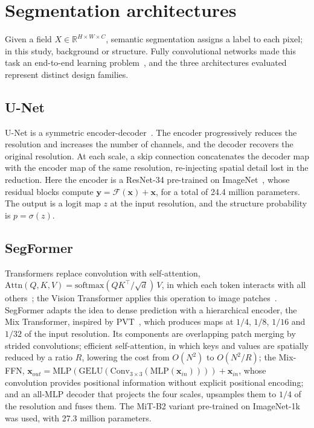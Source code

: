 \documentclass[final,5p,times,twocolumn]{elsarticle}
\begin{document}
\section{Segmentation architectures}\label{sec:sec3}

Given a field $X\in\mathbb{R}^{H\times W\times C}$, semantic segmentation assigns a label to each pixel; in this study, background or structure. Fully convolutional networks made this task an end-to-end learning problem~\cite{long2015fcn}, and the three architectures evaluated represent distinct design families.

\subsection{U-Net}\label{subsec:unet}

U-Net is a symmetric encoder-decoder~\cite{ronneberger2015unet}. The encoder progressively reduces the resolution and increases the number of channels, and the decoder recovers the original resolution. At each scale, a skip connection concatenates the decoder map with the encoder map of the same resolution, re-injecting spatial detail lost in the reduction. Here the encoder is a ResNet-34 pre-trained on ImageNet~\cite{he2016resnet,deng2009imagenet}, whose residual blocks compute $\mathbf{y}=\mathcal{F}(\mathbf{x})+\mathbf{x}$, for a total of 24.4 million parameters. The output is a logit map $z$ at the input resolution, and the structure probability is $p=\sigma(z)$.

\subsection{SegFormer}\label{subsec:segformer}

Transformers replace convolution with self-attention, $\mathrm{Attn}(Q,K,V)=\mathrm{softmax}(QK^\top/\sqrt{d})\,V$, in which each token interacts with all others~\cite{vaswani2017}; the Vision Transformer applies this operation to image patches~\cite{dosovitskiy2021vit}. SegFormer adapts the idea to dense prediction with a hierarchical encoder, the Mix Transformer, inspired by PVT~\cite{wang2021pvt,xie2021segformer}, which produces maps at $1/4$, $1/8$, $1/16$ and $1/32$ of the input resolution. Its components are overlapping patch merging by strided convolutions; efficient self-attention, in which keys and values are spatially reduced by a ratio $R$, lowering the cost from $O(N^2)$ to $O(N^2/R)$; the Mix-FFN, $\mathbf{x}_{out}=\mathrm{MLP}(\mathrm{GELU}(\mathrm{Conv}_{3\times3}(\mathrm{MLP}(\mathbf{x}_{in}))))+\mathbf{x}_{in}$, whose convolution provides positional information without explicit positional encoding; and an all-MLP decoder that projects the four scales, upsamples them to $1/4$ of the resolution and fuses them. The MiT-B2 variant pre-trained on ImageNet-1k was used, with 27.3 million parameters.
\end{document}
